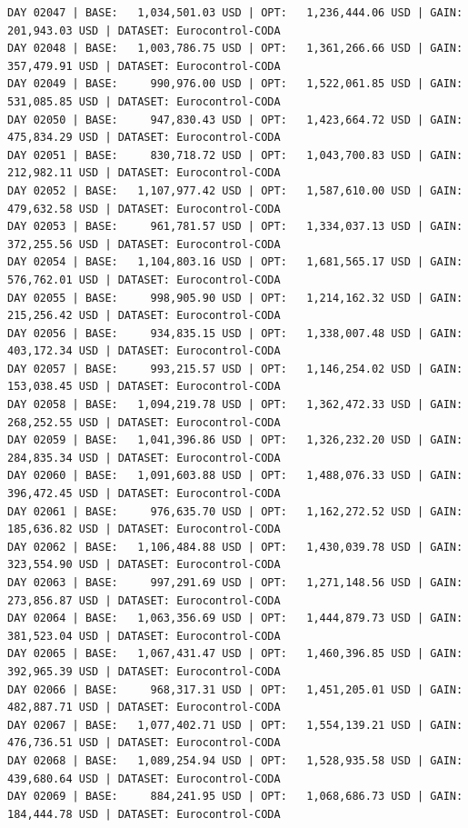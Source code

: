 \documentclass[11pt,a4paper]{article}
\begin{document}
\begin{verbatim}
DAY 02047 | BASE:   1,034,501.03 USD | OPT:   1,236,444.06 USD | GAIN: 201,943.03 USD | DATASET: Eurocontrol-CODA
DAY 02048 | BASE:   1,003,786.75 USD | OPT:   1,361,266.66 USD | GAIN: 357,479.91 USD | DATASET: Eurocontrol-CODA
DAY 02049 | BASE:     990,976.00 USD | OPT:   1,522,061.85 USD | GAIN: 531,085.85 USD | DATASET: Eurocontrol-CODA
DAY 02050 | BASE:     947,830.43 USD | OPT:   1,423,664.72 USD | GAIN: 475,834.29 USD | DATASET: Eurocontrol-CODA
DAY 02051 | BASE:     830,718.72 USD | OPT:   1,043,700.83 USD | GAIN: 212,982.11 USD | DATASET: Eurocontrol-CODA
DAY 02052 | BASE:   1,107,977.42 USD | OPT:   1,587,610.00 USD | GAIN: 479,632.58 USD | DATASET: Eurocontrol-CODA
DAY 02053 | BASE:     961,781.57 USD | OPT:   1,334,037.13 USD | GAIN: 372,255.56 USD | DATASET: Eurocontrol-CODA
DAY 02054 | BASE:   1,104,803.16 USD | OPT:   1,681,565.17 USD | GAIN: 576,762.01 USD | DATASET: Eurocontrol-CODA
DAY 02055 | BASE:     998,905.90 USD | OPT:   1,214,162.32 USD | GAIN: 215,256.42 USD | DATASET: Eurocontrol-CODA
DAY 02056 | BASE:     934,835.15 USD | OPT:   1,338,007.48 USD | GAIN: 403,172.34 USD | DATASET: Eurocontrol-CODA
DAY 02057 | BASE:     993,215.57 USD | OPT:   1,146,254.02 USD | GAIN: 153,038.45 USD | DATASET: Eurocontrol-CODA
DAY 02058 | BASE:   1,094,219.78 USD | OPT:   1,362,472.33 USD | GAIN: 268,252.55 USD | DATASET: Eurocontrol-CODA
DAY 02059 | BASE:   1,041,396.86 USD | OPT:   1,326,232.20 USD | GAIN: 284,835.34 USD | DATASET: Eurocontrol-CODA
DAY 02060 | BASE:   1,091,603.88 USD | OPT:   1,488,076.33 USD | GAIN: 396,472.45 USD | DATASET: Eurocontrol-CODA
DAY 02061 | BASE:     976,635.70 USD | OPT:   1,162,272.52 USD | GAIN: 185,636.82 USD | DATASET: Eurocontrol-CODA
DAY 02062 | BASE:   1,106,484.88 USD | OPT:   1,430,039.78 USD | GAIN: 323,554.90 USD | DATASET: Eurocontrol-CODA
DAY 02063 | BASE:     997,291.69 USD | OPT:   1,271,148.56 USD | GAIN: 273,856.87 USD | DATASET: Eurocontrol-CODA
DAY 02064 | BASE:   1,063,356.69 USD | OPT:   1,444,879.73 USD | GAIN: 381,523.04 USD | DATASET: Eurocontrol-CODA
DAY 02065 | BASE:   1,067,431.47 USD | OPT:   1,460,396.85 USD | GAIN: 392,965.39 USD | DATASET: Eurocontrol-CODA
DAY 02066 | BASE:     968,317.31 USD | OPT:   1,451,205.01 USD | GAIN: 482,887.71 USD | DATASET: Eurocontrol-CODA
DAY 02067 | BASE:   1,077,402.71 USD | OPT:   1,554,139.21 USD | GAIN: 476,736.51 USD | DATASET: Eurocontrol-CODA
DAY 02068 | BASE:   1,089,254.94 USD | OPT:   1,528,935.58 USD | GAIN: 439,680.64 USD | DATASET: Eurocontrol-CODA
DAY 02069 | BASE:     884,241.95 USD | OPT:   1,068,686.73 USD | GAIN: 184,444.78 USD | DATASET: Eurocontrol-CODA

\end{verbatim}
\end{document}
